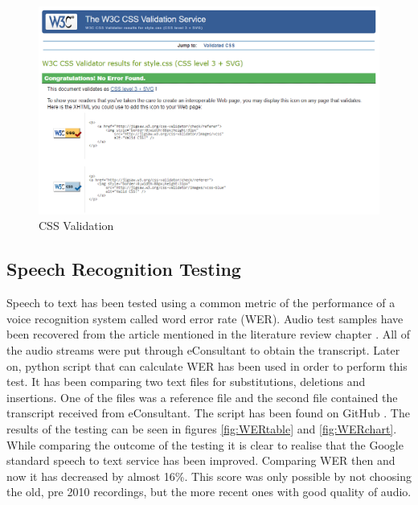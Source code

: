 \documentclass{article}
\begin{document}
\begin{figure}[H]
  \centering
  \includegraphics[scale=0.51]{implementation/css.png}
  \caption{CSS Validation}
  \label{fig:cssvalidation}
\end{figure}

\subsection{Speech Recognition Testing}
{\large 
Speech to text has been tested using a common metric of the performance of a voice recognition system called word error rate (WER). Audio test samples have been recovered from the article mentioned in the literature review chapter \parencite{wertest}. All of the audio streams were put through eConsultant to obtain the transcript. Later on, python script that can calculate WER has been used in order to perform this test. It has been comparing two text files for substitutions, deletions and insertions. One of the files was a reference file and the second file contained the transcript received from eConsultant. The script has been found on GitHub \parencite{wer}. The results of the testing can be seen in figures \ref{fig:WERtable} and \ref{fig:WERchart}. While comparing the outcome of the testing it is clear to realise that the Google standard speech to text service has been improved. Comparing WER then and now it has decreased by almost 16\%. This score was only possible by not choosing the old, pre 2010 recordings, but the more recent ones with good quality of audio.\par
}
\end{document}
